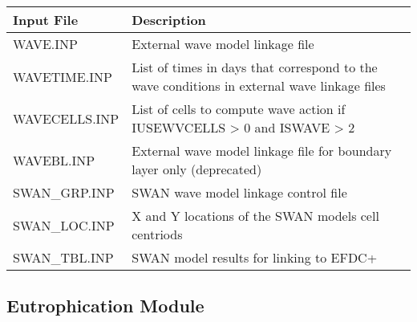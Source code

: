 \documentclass[letterpaper,10pt,english]{sphinxmanual}
\begin{document}
\begin{savenotes}\sphinxattablestart
\centering
\begin{tabulary}{\linewidth}[t]{|T|T|}
\hline
\sphinxstyletheadfamily 
Input File
&\sphinxstyletheadfamily 
Description
\\
\hline
WAVE.INP
&
External wave model linkage file
\\
\hline
WAVETIME.INP
&
List of times in days that correspond to the wave conditions in external wave linkage files
\\
\hline
WAVECELLS.INP
&
List of cells to compute wave action if IUSEWVCELLS \textgreater{} 0 and ISWAVE \textgreater{} 2
\\
\hline
WAVEBL.INP
&
External wave model linkage file for boundary layer only (deprecated)
\\
\hline
SWAN\_GRP.INP
&
SWAN wave model linkage control file
\\
\hline
SWAN\_LOC.INP
&
X and Y locations of the SWAN models cell centriods
\\
\hline
SWAN\_TBL.INP
&
SWAN model results for linking to EFDC+
\\
\hline
\end{tabulary}
\par
\sphinxattableend\end{savenotes}


\subsection{Eutrophication Module}
\label{\detokenize{inputfiles/eutro:eutrophication-module}}\label{\detokenize{inputfiles/eutro:eutro}}\label{\detokenize{inputfiles/eutro::doc}}
\end{document}
